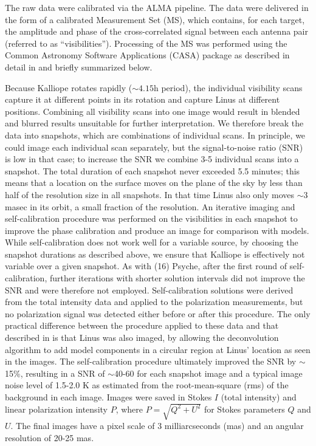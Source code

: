 \documentclass[]{aastex631}
\begin{document}
The raw data were calibrated via the ALMA pipeline. The data were delivered in the form of a calibrated Measurement Set (MS), which contains, for each target, the amplitude and phase of the cross-correlated signal between each antenna pair (referred to as ``visibilities''). Processing of the MS was performed using the Common Astronomy Software Applications (CASA) package \citep{mcmullin2007} as described in detail in \cite{dekleer2021} and briefly summarized below.

Because Kalliope rotates rapidly (${\sim}4.15$h period), the individual visibility scans capture it at different points in its rotation and capture Linus at different positions. Combining all visibility scans into one image would result in blended and blurred results unsuitable for further interpretation. We therefore break the data into snapshots, which are combinations of individual scans.  In principle, we could image each individual scan separately, but the signal-to-noise ratio (SNR) is low in that case; to increase the SNR we combine 3-5 individual scans into a snapshot.  The total duration of each snapshot never exceeded 5.5 minutes; this means that a location on the surface moves on the plane of the sky by less than half of the resolution size in all snapshots.  In that time Linus also only moves ${\sim}3$ masec in its orbit, a small fraction of the resolution.  An iterative imaging and self-calibration procedure \citep{cornwell1999} was performed on the visibilities in each snapshot to improve the phase calibration and produce an image for comparison with models. While self-calibration does not work well for a variable source, by choosing the snapshot durations as described above, we ensure that Kalliope is effectively not variable over a given snapshot. As with (16) Psyche, after the first round of self-calibration, further iterations with shorter solution intervals did not improve the SNR and were therefore not employed. Self-calibration solutions were derived from the total intensity data and applied to the polarization measurements, but no polarization signal was detected either before or after this procedure. The only practical difference between the procedure applied to these data and that described in \cite{dekleer2021} is that Linus was also imaged, by allowing the deconvolution algorithm to add model components in a circular region at Linus' location as seen in the images. The self-calibration procedure ultimately improved the SNR by $\sim$15\%, resulting in a SNR of $\sim$40-60 for each snapshot image and a typical image noise level of 1.5-2.0 K as estimated from the root-mean-square (rms) of the background in each image. Images were saved in Stokes $I$ (total intensity) and linear polarization intensity $P$, where $P=\sqrt{Q^2+U^2}$ for Stokes parameters $Q$ and $U$. The final images have a pixel scale of 3 milliarcseconds (mas) and an angular resolution of 20-25 mas. \par
\end{document}

